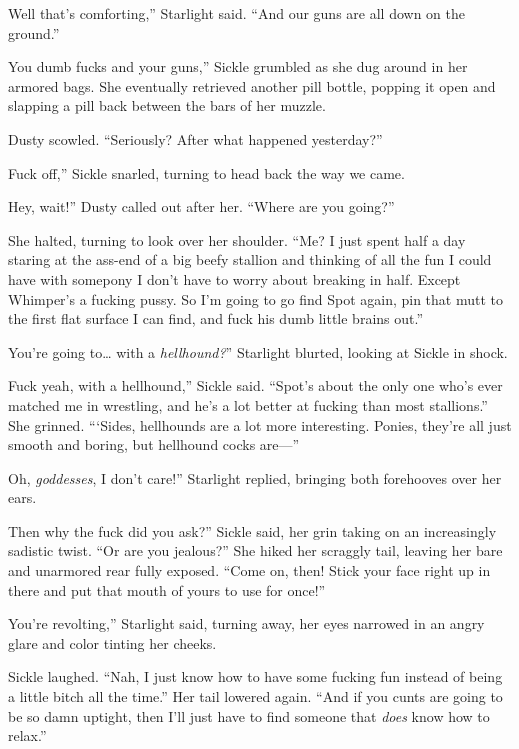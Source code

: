 \leavevmode{}Well that’s comforting,” Starlight said. “And our guns are all down on the ground.”

\leavevmode{}You dumb fucks and your guns,” Sickle grumbled as she dug around in her armored bags. She eventually retrieved another pill bottle, popping it open and slapping a pill back between the bars of her muzzle.

Dusty scowled. “Seriously? After what happened yesterday?”

\leavevmode{}Fuck off,” Sickle snarled, turning to head back the way we came.

\leavevmode{}Hey, wait!” Dusty called out after her. “Where are you going?”

She halted, turning to look over her shoulder. “Me? I just spent half a day staring at the ass-end of a big beefy stallion and thinking of all the fun I could have with somepony I don’t have to worry about breaking in half. Except Whimper’s a fucking pussy. So I’m going to go find Spot again, pin that mutt to the first flat surface I can find, and fuck his dumb little brains out.”

\leavevmode{}You’re going to… with a \textit{hellhound?}” Starlight blurted, looking at Sickle in shock.

\leavevmode{}Fuck yeah, with a hellhound,” Sickle said. “Spot’s about the only one who’s ever matched me in wrestling, and he’s a lot better at fucking than most stallions.” She grinned. “‘Sides, hellhounds are a lot more interesting. Ponies, they’re all just smooth and boring, but hellhound cocks are—”

\leavevmode{}Oh, \textit{goddesses}, I don’t care!” Starlight replied, bringing both forehooves over her ears.

\leavevmode{}Then why the fuck did you ask?” Sickle said, her grin taking on an increasingly sadistic twist. “Or are you jealous?” She hiked her scraggly tail, leaving her bare and unarmored rear fully exposed. “Come on, then! Stick your face right up in there and put that mouth of yours to use for once!”

\leavevmode{}You’re revolting,” Starlight said, turning away, her eyes narrowed in an angry glare and color tinting her cheeks.

Sickle laughed. “Nah, I just know how to have some fucking fun instead of being a little bitch all the time.” Her tail lowered again. “And if you cunts are going to be so damn uptight, then I’ll just have to find someone that \textit{does} know how to relax.”

